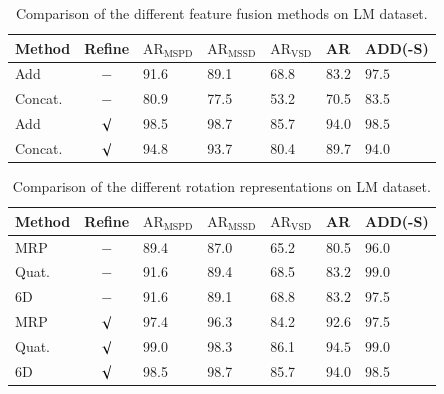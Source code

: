 \documentclass[12pt,DIV14,BCOR12mm,a4paper,footinclude=false,headinclude,parskip=half-,twoside,openright,cleardoublepage=empty,toc=index,bibliography=totoc,listof=totoc]{scrreprt}
\numberwithin{equation}{chapter}
\begin{document}
\begin{table}[H]
  \centering
  \caption{Comparison of the different feature fusion methods on LM dataset.}
  \label{tab:ab_fusion_lm}
  \begin{tabular}{l | c | C{16mm} C{16mm} C{16mm}| C{16mm}| C{16mm}}
      \toprule
      Method & Refine & $\text{AR}_{\text{MSPD}}$ & $\text{AR}_{\text{MSSD}}$ & $\text{AR}_{\text{VSD}}$ & AR & ADD(-S) \\
      \midrule
      Add  & $-$ & 91.6 & 89.1 & 68.8 & $\mathbf{83.2}$ & $\mathbf{97.5}$ \\
      Concat. & $-$ & 80.9 & 77.5 & 53.2 & 70.5 & 83.5 \\
      Add  & $\surd $ & 98.5 & 98.7 & 85.7 & $\mathbf{94.0}$ & $\mathbf{98.5}$ \\
      Concat. & $\surd $ & 94.8 & 93.7 & 80.4 & 89.7 & 94.0 \\
      \bottomrule
  \end{tabular}
\end{table}

\begin{table}[H]
  \centering
  \caption{Comparison of the different rotation representations on LM dataset.}
  \label{tab:ab_rot_lm}
  \begin{tabular}{l | c | C{16mm} C{16mm} C{16mm}| C{16mm}| C{16mm}}
      \toprule
      Method & Refine & $\text{AR}_{\text{MSPD}}$ & $\text{AR}_{\text{MSSD}}$ & $\text{AR}_{\text{VSD}}$ & AR & ADD(-S) \\
      \midrule
      MRP   & $-$     & 89.4 & 87.0 & 65.2 & 80.5 & 96.0 \\
      Quat. & $-$     & 91.6 & 89.4 & 68.5 & $\mathbf{83.2}$ & $\mathbf{99.0}$ \\
      6D    & $-$     & 91.6 & 89.1 & 68.8 & $\mathbf{83.2}$ & 97.5 \\
      MRP   & $\surd$ & 97.4 & 96.3 & 84.2 & 92.6 & 97.5 \\
      Quat. & $\surd$ & 99.0 & 98.3 & 86.1 & $\mathbf{94.5}$ & $\mathbf{99.0}$ \\
      6D    & $\surd$ & 98.5 & 98.7 & 85.7 & 94.0 & 98.5 \\
      \bottomrule
  \end{tabular}
\end{table}
\end{document}
